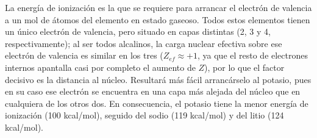 \begin{question}
\begin{solu}
        La energía de ionización es la que se requiere para arrancar
        el electrón de valencia a un mol de átomos del elemento en
        estado gaseoso. Todos estos elementos tienen un único electrón
        de valencia, pero situado en capas distintas (2, 3 y 4,
        respectivamente); al ser todos alcalinos, la carga nuclear
        efectiva sobre ese electrón de valencia es similar en los tres
        (\(Z_{ef} \approx +1\), ya que el resto de electrones internos
        apantalla casi por completo el aumento de \(Z\)), por lo que el
        factor decisivo es la distancia al núcleo. Resultará más fácil
        arrancárselo al potasio, pues en su caso ese electrón se
        encuentra en una capa más alejada del núcleo que en cualquiera
        de los otros dos. En consecuencia, el potasio tiene la menor
        energía de ionización (100 kcal/mol), seguido del sodio
        (119 kcal/mol) y del litio (124 kcal/mol).


    \end{solu}

\end{question}

